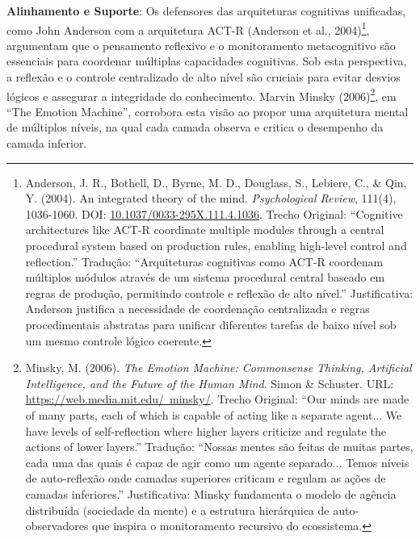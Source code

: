 \documentclass[12pt,a4paper,oneside]{abntex2}
\begin{document}
\textbf{Alinhamento e Suporte}: Os defensores das arquiteturas cognitivas unificadas, como John Anderson com a arquitetura ACT-R (Anderson et al., 2004)\footnote{Anderson, J. R., Bothell, D., Byrne, M. D., Douglass, S., Lebiere, C., \& Qin, Y. (2004). An integrated theory of the mind. \textit{Psychological Review}, 111(4), 1036-1060. DOI: \href{https://doi.org/10.1037/0033-295X.111.4.1036}{10.1037/0033-295X.111.4.1036}. Trecho Original: ``Cognitive architectures like ACT-R coordinate multiple modules through a central procedural system based on production rules, enabling high-level control and reflection.'' Tradução: ``Arquiteturas cognitivas como ACT-R coordenam múltiplos módulos através de um sistema procedural central baseado em regras de produção, permitindo controle e reflexão de alto nível.'' Justificativa: Anderson justifica a necessidade de coordenação centralizada e regras procedimentais abstratas para unificar diferentes tarefas de baixo nível sob um mesmo controle lógico coerente.}, argumentam que o pensamento reflexivo e o monitoramento metacognitivo são essenciais para coordenar múltiplas capacidades cognitivas. Sob esta perspectiva, a reflexão e o controle centralizado de alto nível são cruciais para evitar desvios lógicos e assegurar a integridade do conhecimento. Marvin Minsky (2006)\footnote{Minsky, M. (2006). \textit{The Emotion Machine: Commonsense Thinking, Artificial Intelligence, and the Future of the Human Mind}. Simon \& Schuster. URL: \href{https://web.media.mit.edu/~minsky/}{https://web.media.mit.edu/~minsky/}. Trecho Original: ``Our minds are made of many parts, each of which is capable of acting like a separate agent... We have levels of self-reflection where higher layers criticize and regulate the actions of lower layers.'' Tradução: ``Nossas mentes são feitas de muitas partes, cada uma das quais é capaz de agir como um agente separado... Temos níveis de auto-reflexão onde camadas superiores criticam e regulam as ações de camadas inferiores.'' Justificativa: Minsky fundamenta o modelo de agência distribuída (sociedade da mente) e a estrutura hierárquica de auto-observadores que inspira o monitoramento recursivo do ecossistema.}, em ``The Emotion Machine'', corrobora esta visão ao propor uma arquitetura mental de múltiplos níveis, na qual cada camada observa e critica o desempenho da camada inferior.
\end{document}
